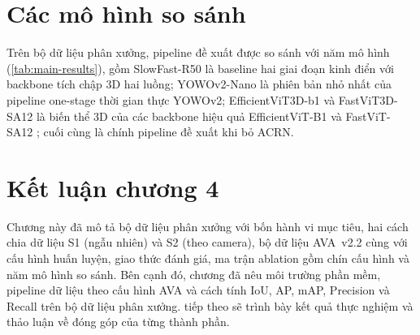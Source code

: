 \section{Các mô hình so sánh}
\label{sec:baselines}

Trên bộ dữ liệu phân xưởng, pipeline đề xuất được so sánh với năm mô hình (\cref{tab:main-results}), gồm SlowFast-R50 \cite{feichtenhofer2019slowfast} là baseline hai giai đoạn kinh điển với backbone tích chập 3D hai luồng; YOWOv2-Nano \cite{yang2023yowov2} là phiên bản nhỏ nhất của pipeline one-stage thời gian thực YOWOv2; EfficientViT3D-b1 và FastViT3D-SA12 là biến thể 3D của các backbone hiệu quả EfficientViT-B1 \cite{cai2023efficientvit} và FastViT-SA12 \cite{vasu2023fastvit}; cuối cùng là chính pipeline đề xuất khi bỏ ACRN.

%

\section*{Kết luận chương 4}

Chương này đã mô tả bộ dữ liệu phân xưởng với bốn hành vi mục tiêu, hai cách chia dữ liệu S1 (ngẫu nhiên) và S2 (theo camera), bộ dữ liệu AVA~v2.2 cùng với cấu hình huấn luyện, giao thức đánh giá, ma trận ablation gồm chín cấu hình và năm mô hình so sánh. Bên cạnh đó, chương đã nêu môi trường phần mềm, pipeline dữ liệu theo cấu hình AVA và cách tính IoU, AP, mAP, Precision và Recall trên bộ dữ liệu phân xưởng.  tiếp theo sẽ trình bày kết quả thực nghiệm và thảo luận về đóng góp của từng thành phần.
